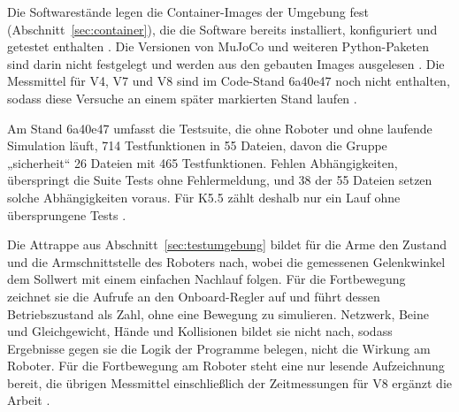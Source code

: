 Die Softwarestände legen die Container-Images der Umgebung fest (Abschnitt~\ref{sec:container}), die die Software bereits installiert, konfiguriert und getestet enthalten \cite{Boettiger2015}.
Die Versionen von MuJoCo und weiteren Python-Paketen sind darin nicht festgelegt und werden aus den gebauten Images ausgelesen .
Die Messmittel für V4, V7 und V8 sind im Code-Stand 6a40e47 noch nicht enthalten, sodass diese Versuche an einem später markierten Stand laufen .

Am Stand 6a40e47 umfasst die Testsuite, die ohne Roboter und ohne laufende Simulation läuft, 714 Testfunktionen in 55 Dateien, davon die Gruppe „sicherheit“ 26 Dateien mit 465 Testfunktionen.
Fehlen Abhängigkeiten, überspringt die Suite Tests ohne Fehlermeldung, und 38 der 55 Dateien setzen solche Abhängigkeiten voraus.
Für K5.5 zählt deshalb nur ein Lauf ohne übersprungene Tests .

Die Attrappe aus Abschnitt~\ref{sec:testumgebung} bildet für die Arme den Zustand und die Armschnittstelle des Roboters nach, wobei die gemessenen Gelenkwinkel dem Sollwert mit einem einfachen Nachlauf folgen.
Für die Fortbewegung zeichnet sie die Aufrufe an den Onboard-Regler auf und führt dessen Betriebszustand als Zahl, ohne eine Bewegung zu simulieren.
Netzwerk, Beine und Gleichgewicht, Hände und Kollisionen bildet sie nicht nach, sodass Ergebnisse gegen sie die Logik der Programme belegen, nicht die Wirkung am Roboter.
Für die Fortbewegung am Roboter steht eine nur lesende Aufzeichnung bereit, die übrigen Messmittel einschließlich der Zeitmessungen für V8 ergänzt die Arbeit .

